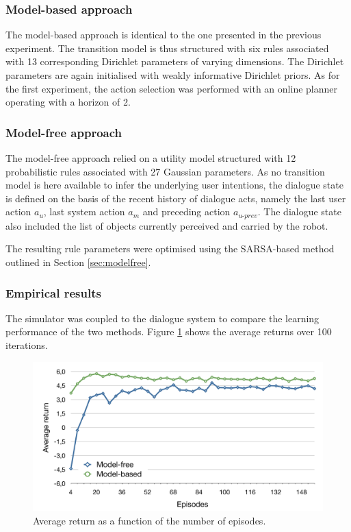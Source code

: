 \subsubsection*{Model-based approach}

The model-based approach is identical to the one presented in the previous experiment. The transition model is thus structured with six rules associated with 13 corresponding Dirichlet parameters of varying dimensions.   The Dirichlet parameters are again initialised with weakly informative Dirichlet priors.  As for the first experiment, the action selection was performed with an online planner operating with a horizon of 2. 

\subsubsection*{Model-free approach}

The model-free approach relied on a utility model structured with 12 probabilistic rules associated with 27 Gaussian parameters. As no transition model is here available to infer the underlying user intentions, the dialogue state is defined on the basis of the recent history of dialogue acts, namely the last user action $a_u$, last system action $a_m$ and preceding action $a_{u\mbox{-}prev}$. The dialogue state also included the list of objects currently perceived and carried by the robot.

The resulting rule parameters were optimised using the SARSA-based method outlined in Section \ref{sec:modelfree}. 

\subsubsection*{Empirical results}

The simulator was coupled to the dialogue system to compare the learning performance of the two methods.  Figure \ref{fig:return_episodes} shows the average returns over 100 iterations.

\begin{figure}[p]
\centering
\includegraphics[scale=0.42]{imgs/episodes.pdf}
\caption{Average return as a function of the number of episodes.}
\label{fig:return_episodes}
\end{figure}


